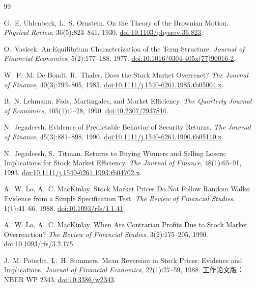 \begin{thebibliography}{99}

 G.~E. Uhlenbeck, L.~S. Ornstein. On the Theory of the Brownian Motion. \emph{Physical Review}, 36(5):823--841, 1930. \href{https://doi.org/10.1103/physrev.36.823}{doi:10.1103/physrev.36.823}.

 O.~Vasicek. An Equilibrium Characterization of the Term Structure. \emph{Journal of Financial Economics}, 5(2):177--188, 1977. \href{https://doi.org/10.1016/0304-405x(77)90016-2}{doi:10.1016/0304-405x(77)90016-2}.

 W.~F.~M. De Bondt, R.~Thaler. Does the Stock Market Overreact? \emph{The Journal of Finance}, 40(3):793--805, 1985. \href{https://doi.org/10.1111/j.1540-6261.1985.tb05004.x}{doi:10.1111/j.1540-6261.1985.tb05004.x}.

 B.~N. Lehmann. Fads, Martingales, and Market Efficiency. \emph{The Quarterly Journal of Economics}, 105(1):1--28, 1990. \href{https://doi.org/10.2307/2937816}{doi:10.2307/2937816}.

 N.~Jegadeesh. Evidence of Predictable Behavior of Security Returns. \emph{The Journal of Finance}, 45(3):881--898, 1990. \href{https://doi.org/10.1111/j.1540-6261.1990.tb05110.x}{doi:10.1111/j.1540-6261.1990.tb05110.x}.

 N.~Jegadeesh, S.~Titman. Returns to Buying Winners and Selling Losers: Implications for Stock Market Efficiency. \emph{The Journal of Finance}, 48(1):65--91, 1993. \href{https://doi.org/10.1111/j.1540-6261.1993.tb04702.x}{doi:10.1111/j.1540-6261.1993.tb04702.x}.

 A.~W. Lo, A.~C. MacKinlay. Stock Market Prices Do Not Follow Random Walks: Evidence from a Simple Specification Test. \emph{The Review of Financial Studies}, 1(1):41--66, 1988. \href{https://doi.org/10.1093/rfs/1.1.41}{doi:10.1093/rfs/1.1.41}.

 A.~W. Lo, A.~C. MacKinlay. When Are Contrarian Profits Due to Stock Market Overreaction? \emph{The Review of Financial Studies}, 3(2):175--205, 1990. \href{https://doi.org/10.1093/rfs/3.2.175}{doi:10.1093/rfs/3.2.175}.

 J.~M. Poterba, L.~H. Summers. Mean Reversion in Stock Prices: Evidence and Implications. \emph{Journal of Financial Economics}, 22(1):27--59, 1988. 工作论文版：NBER WP 2343, \href{https://doi.org/10.3386/w2343}{doi:10.3386/w2343}.


\end{thebibliography}
